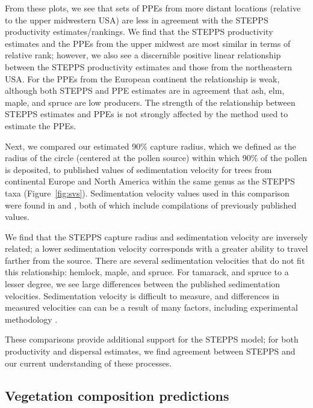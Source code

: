 \documentclass[12pt]{article}
\begin{document}
From these plots, we see that sets of PPEs from more distant locations
(relative to the upper midwestern USA) are less in agreement with the
STEPPS productivity estimates/rankings.  We find that the STEPPS
productivity estimates and the PPEs from the upper midwest are most
similar in terms of relative rank; however, we also see a discernible
positive linear relationship between the STEPPS productivity estimates
and those from the northeastern USA. For the PPEs from the European
continent the relationship is weak, although both STEPPS and PPE
estimates are in agreement that ash, elm, maple, and spruce are low
producers. The strength of the relationship between STEPPS estimates
and PPEs is not strongly affected by the method used to estimate the
PPEs.

Next, we compared our estimated 90\% capture radius, which we defined
as the radius of the circle (centered at the pollen source) within
which 90\% of the pollen is deposited, to published values of
sedimentation velocity for trees from continental Europe and North
America within the same genus as the STEPPS taxa
(Figure~\ref{fig:svs}). Sedimentation velocity values used in this
comparison were found in \citet{jackson1999pollen} and
\citet{matthias2014insights}, both of which include compilations of
previously published values.


We find that the STEPPS capture radius and sedimentation velocity are
inversely related; a lower sedimentation velocity corresponds with a
greater ability to travel farther from the source. There are several
sedimentation velocities that do not fit this relationship: hemlock,
maple, and spruce. For tamarack, and spruce to a lesser degree, we see
large differences between the published sedimentation
velocities. Sedimentation velocity is difficult to measure, and
differences in measured velocities can can be a result of many
factors, including experimental methodology \citep{XXX}.

These comparisons provide additional support for the STEPPS model; for
both productivity and dispersal estimates, we find agreement between
STEPPS and our current understanding of these processes.

\subsection{Vegetation composition predictions}
\end{document}
